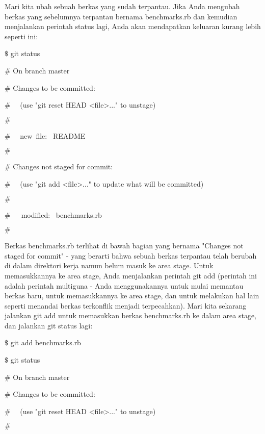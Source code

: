  \par
\noindent 
Mari kita ubah sebuah berkas yang sudah terpantau. Jika Anda mengubah berkas yang sebelumnya terpantau bernama $  $benchmarks.rb $  $dan kemudian menjalankan perintah $  $status $  $lagi, Anda akan mendapatkan keluaran kurang lebih seperti ini: \par
\noindent 
 $  \$  $ git status \par
\noindent 
 $  \#  $ On branch master \par
\noindent 
 $  \#  $ Changes to be committed: \par
\noindent 
 $  \#  $~~ (use "git reset HEAD <file>..." to unstage) \par
\noindent 
 $  \#  $ \par
\noindent 
 $  \#  $~~ new~file:~  README \par
\noindent 
 $  \#  $ \par
\noindent 
 $  \#  $ Changes not staged for commit: \par
\noindent 
 $  \#  $~~ (use "git add <file>..." to update what will be committed) \par
\noindent 
 $  \#  $ \par
\noindent 
 $  \#  $~~~modified:~  benchmarks.rb \par
\noindent 
 $  \#  $ \par
\noindent 
Berkas benchmarks.rb terlihat di bawah bagian yang bernama "Changes not staged for commit" - yang berarti bahwa sebuah berkas terpantau telah berubah di dalam direktori kerja namun belum masuk ke area stage. Untuk memasukkannya ke area stage, Anda menjalankan perintah $  $git add $  $(perintah ini adalah perintah multiguna - Anda menggunakannya untuk mulai memantau berkas baru, untuk memasukkannya ke area stage, dan untuk melakukan hal lain seperti menandai berkas terkonflik menjadi terpecahkan). Mari kita sekarang jalankan $  $git add $  $untuk memasukkan berkas benchmarks.rb ke dalam area stage, dan jalankan $  $git status $  $lagi: \par
\noindent 
 $  \$  $ git add benchmarks.rb \par
\noindent 
 $  \$  $ git status \par
\noindent 
 $  \#  $ On branch master \par
\noindent 
 $  \#  $ Changes to be committed: \par
\noindent 
 $  \#  $~~ (use "git reset HEAD <file>..." to unstage) \par
\noindent 
 $  \#  $ \par
\noindent 
